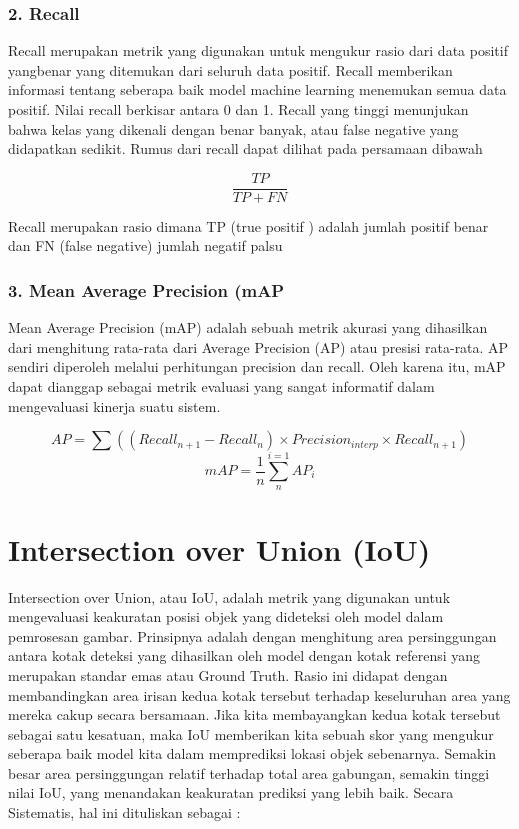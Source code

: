 \subsubsection*{2. Recall}
Recall merupakan metrik yang digunakan untuk mengukur rasio dari data positif yangbenar yang ditemukan dari seluruh data positif. Recall memberikan informasi tentang seberapa baik model machine learning menemukan semua data positif. Nilai recall berkisar antara 0 dan 1. Recall yang tinggi menunjukan bahwa kelas yang dikenali dengan benar banyak, atau false negative yang didapatkan sedikit. Rumus dari recall dapat dilihat pada persamaan dibawah

\begin{equation}
    \frac{TP}{TP+FN}
\end{equation}

Recall merupakan rasio dimana TP (true positif ) adalah jumlah positif benar dan FN (false negative) jumlah negatif palsu

\subsubsection*{3. Mean Average Precision (mAP}
Mean Average Precision (mAP) adalah sebuah metrik akurasi yang dihasilkan dari menghitung rata-rata dari Average Precision (AP) atau presisi rata-rata. AP sendiri diperoleh melalui perhitungan precision dan recall. Oleh karena itu, mAP dapat dianggap sebagai metrik evaluasi yang sangat informatif dalam mengevaluasi kinerja suatu sistem.

\begin{equation}
    AP=\sum ((Recall_{n+1}-Recall_{n})\times Precision_{interp}\times Recall_{n+1})
\end{equation}
\begin{equation}
    mAP=\frac{1}{n}\sum_{n}^{i=1}AP_{i}
\end{equation}

\section{Intersection over Union (IoU)}
\label{subsec:hukumnewton}

Intersection over Union, atau IoU, adalah metrik yang digunakan untuk mengevaluasi keakuratan posisi objek yang dideteksi oleh model dalam pemrosesan gambar. Prinsipnya adalah dengan menghitung area persinggungan antara kotak deteksi yang dihasilkan oleh model dengan kotak referensi yang merupakan standar emas atau Ground Truth. Rasio ini didapat dengan membandingkan area irisan kedua kotak tersebut terhadap keseluruhan area yang mereka cakup secara bersamaan. Jika kita membayangkan kedua kotak tersebut sebagai satu kesatuan, maka IoU memberikan kita sebuah skor yang mengukur seberapa baik model kita dalam memprediksi lokasi objek sebenarnya. Semakin besar area persinggungan relatif terhadap total area gabungan, semakin tinggi nilai IoU, yang menandakan keakuratan prediksi yang lebih baik. Secara Sistematis, hal ini dituliskan sebagai :

